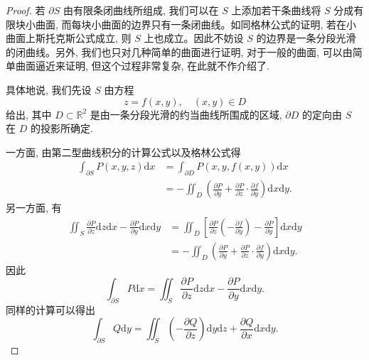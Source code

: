\begin{proof}
若 $\partial S$ 由有限条闭曲线所组成, 我们可以在 $S$ 上添加若干条曲线将 $S$ 分成有限块小曲面, 而每块小曲面的边界只有一条闭曲线。如同格林公式的证明, 若在小曲面上斯托克斯公式成立, 则 $S$ 上也成立。因此不妨设 $S$ 的边界是一条分段光滑的闭曲线。另外, 我们也只对几种简单的曲面进行证明, 对于一般的曲面, 可以由简单曲面逼近来证明, 但这个过程非常复杂, 在此就不作介绍了.

具体地说, 我们先设 $S$ 由方程
\begin{equation}
  z=f(x,y),\quad (x,y)\in D
  \label{eq:ma-16-5-1}
\end{equation}
给出, 其中 $D\subset\mathbb R^2$ 是由一条分段光滑的约当曲线所围成的区域, $\partial D$ 的定向由 $S$ 在 $D$ 的投影所确定.

一方面, 由第二型曲线积分的计算公式以及格林公式得
\[
\begin{aligned}
  \int_{\partial S}P(x,y,z)\mathrm dx
  &=\int_{\partial D}P(x,y,f(x,y))\mathrm dx\\
  &=-\iint_D\left(\frac{\partial P}{\partial y}
    +\frac{\partial P}{\partial z}\cdot\frac{\partial f}{\partial y}\right)\mathrm dx\mathrm dy.
\end{aligned}
\]
另一方面, 有
\[
\begin{aligned}
  \iint_S\frac{\partial P}{\partial z}\mathrm dz\mathrm dx
  -\frac{\partial P}{\partial y}\mathrm dx\mathrm dy
  &=\iint_D\left[\frac{\partial P}{\partial z}\left(-\frac{\partial f}{\partial y}\right)
    -\frac{\partial P}{\partial y}\right]\mathrm dx\mathrm dy\\
  &=-\iint_D\left(\frac{\partial P}{\partial y}
    +\frac{\partial P}{\partial z}\cdot\frac{\partial f}{\partial y}\right)\mathrm dx\mathrm dy.
\end{aligned}
\]
因此
\[
  \int_{\partial S}P\mathrm dx
  =\iint_S\frac{\partial P}{\partial z}\mathrm dz\mathrm dx
    -\frac{\partial P}{\partial y}\mathrm dx\mathrm dy.
\]
同样的计算可以得出
\[
  \int_{\partial S}Q\mathrm dy
  =\iint_S\left(-\frac{\partial Q}{\partial z}\right)\mathrm dy\mathrm dz
    +\frac{\partial Q}{\partial x}\mathrm dx\mathrm dy.
\]


\end{proof}
